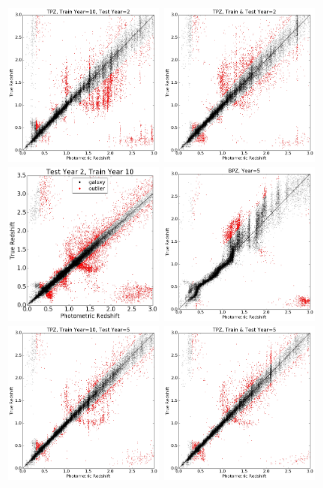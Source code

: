 \documentclass[DM,lsstdraft,toc]{lsstdoc}
\begin{document}
\begin{figure}
\begin{center}
\includegraphics[width=4.0cm]{figures/TPZ_Euclid_10Y2_tzpz.png}
\includegraphics[width=4.0cm]{figures/TPZ_Euclid_2Y2_tzpz.png}
\includegraphics[width=4.0cm]{figures/CM_10Y2_tzpz.png}
\includegraphics[width=4.0cm]{figures/BPZ_Euclid_Y5_tzpz.png}
\includegraphics[width=4.0cm]{figures/TPZ_Euclid_10Y5_tzpz.png}
\includegraphics[width=4.0cm]{figures/TPZ_Euclid_5Y5_tzpz.png}

\end{center}
\end{figure}
\end{document}
